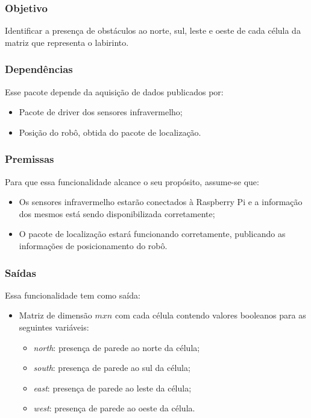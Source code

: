 \subsubsection{Objetivo}
Identificar a presença de obstáculos ao norte, sul, leste e oeste de cada célula da matriz que representa o labirinto.

\subsubsection{Dependências}
Esse pacote depende da aquisição de dados publicados por:
\begin{itemize}
	\item Pacote de driver dos sensores infravermelho;
	\item Posição do robô, obtida do pacote de localização. 
\end{itemize}

\subsubsection{Premissas}
Para que essa funcionalidade alcance o seu propósito, assume-se que:
\begin{itemize}
	\item Os sensores infravermelho estarão conectados à Raspberry Pi e a informação dos mesmos está sendo disponibilizada corretamente;
	\item O pacote de localização estará funcionando corretamente, publicando as informações de posicionamento do robô.
\end{itemize}

\subsubsection{Saídas}
Essa funcionalidade tem como saída:
\begin{itemize}
	\item Matriz de dimensão $mxn$ com cada célula contendo valores booleanos para as seguintes variáveis:
	\begin{itemize}
		\item \textit{north}: presença de parede ao norte da célula;
		\item \textit{south}: presença de parede ao sul da célula;
		\item \textit{east}: presença de parede ao leste da célula;
		\item \textit{west}: presença de parede ao oeste da célula.
	\end{itemize}
\end{itemize}


